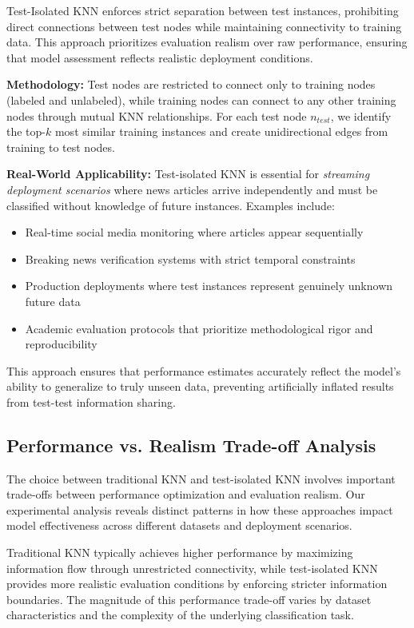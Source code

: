 Test-Isolated KNN enforces strict separation between test instances, prohibiting direct connections between test nodes while maintaining connectivity to training data. This approach prioritizes evaluation realism over raw performance, ensuring that model assessment reflects realistic deployment conditions.

\textbf{Methodology:} Test nodes are restricted to connect only to training nodes (labeled and unlabeled), while training nodes can connect to any other training nodes through mutual KNN relationships. For each test node $n_{test}$, we identify the top-$k$ most similar training instances and create unidirectional edges from training to test nodes.

\textbf{Real-World Applicability:} Test-isolated KNN is essential for \emph{streaming deployment scenarios} where news articles arrive independently and must be classified without knowledge of future instances. Examples include:
\begin{itemize}
    \item Real-time social media monitoring where articles appear sequentially
    \item Breaking news verification systems with strict temporal constraints
    \item Production deployments where test instances represent genuinely unknown future data
    \item Academic evaluation protocols that prioritize methodological rigor and reproducibility
\end{itemize}

This approach ensures that performance estimates accurately reflect the model's ability to generalize to truly unseen data, preventing artificially inflated results from test-test information sharing.

\subsection{Performance vs. Realism Trade-off Analysis}

The choice between traditional KNN and test-isolated KNN involves important trade-offs between performance optimization and evaluation realism. Our experimental analysis reveals distinct patterns in how these approaches impact model effectiveness across different datasets and deployment scenarios.

Traditional KNN typically achieves higher performance by maximizing information flow through unrestricted connectivity, while test-isolated KNN provides more realistic evaluation conditions by enforcing stricter information boundaries. The magnitude of this performance trade-off varies by dataset characteristics and the complexity of the underlying classification task.


